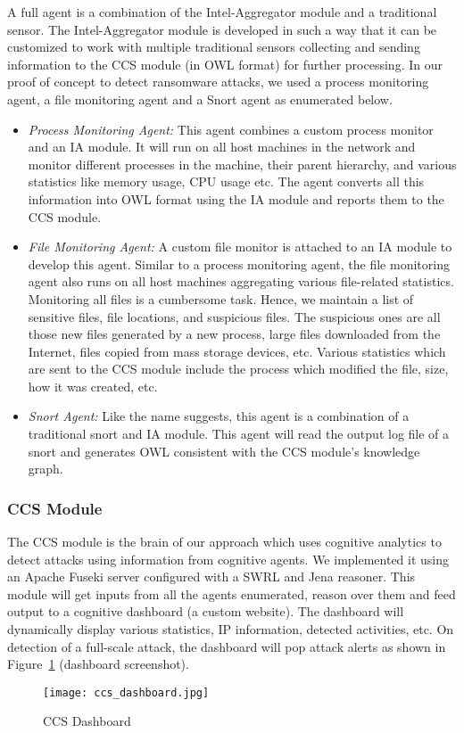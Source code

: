 A full agent is a combination of the Intel-Aggregator module and a traditional sensor. The Intel-Aggregator module is developed in such a way that it can be customized to work with multiple traditional sensors collecting and sending information to the CCS module (in OWL format) for further processing. In our proof of concept to detect ransomware attacks, we used a process monitoring agent, a file monitoring agent and a Snort agent as enumerated below.
\begin{itemize}
	\item \textit{Process Monitoring Agent:} This agent combines a  custom process monitor and an IA module. It will run on all host machines in the network and monitor different processes in the machine, their parent hierarchy, and various statistics like memory usage, CPU usage etc. The agent converts all this information into OWL format using the IA module and reports them to the CCS module.
	\item \textit{File Monitoring Agent:} A custom file monitor is attached to an IA module to develop this agent. Similar to a process monitoring agent, the file monitoring agent also runs on all host machines aggregating various file-related statistics. Monitoring all files is a cumbersome task. Hence, we maintain a list of sensitive files, file locations, and suspicious files. The suspicious ones are all those new files generated by a new process, large files downloaded from the Internet, files copied from mass storage devices, etc. Various statistics which are sent to the CCS module include the process which modified the file, size, how it was created, etc. 
	\item \textit{Snort Agent:} Like the name suggests, this agent is a combination of a traditional snort and IA module. This agent will read the output log file of a snort and generates OWL consistent with the CCS module's knowledge graph.
\end{itemize}

\subsubsection{CCS Module}

The CCS module is the brain of our approach which uses cognitive analytics to detect attacks using information from cognitive agents. We implemented it using an Apache Fuseki server configured with a SWRL and Jena reasoner. This module will get inputs from all the agents enumerated, reason over them and feed output to a cognitive dashboard (a custom website). The dashboard will dynamically display various statistics, IP information, detected activities, etc. On detection of a full-scale attack, the dashboard will pop attack alerts as shown in Figure~\ref{fig:ccs_dashboard} (dashboard screenshot).
\begin{figure}	
	\texttt{[image: ccs\_dashboard.jpg]}
	\caption{CCS Dashboard}	
	\label{fig:ccs_dashboard}
\end{figure}

